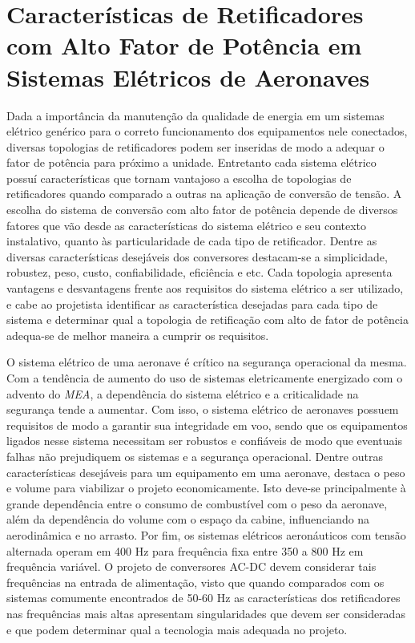 \section{Características de Retificadores com Alto Fator de Potência em Sistemas Elétricos de Aeronaves}

Dada a importância da manutenção da qualidade de energia em um sistemas elétrico genérico para o correto funcionamento dos equipamentos nele conectados, diversas topologias de retificadores podem ser inseridas de modo a adequar o fator de potência para próximo a unidade. Entretanto cada sistema elétrico possuí características que tornam vantajoso a escolha de topologias de retificadores quando comparado a outras na aplicação de conversão de tensão. A escolha do sistema de conversão com alto fator de potência depende de diversos fatores que vão desde as características do sistema elétrico e seu contexto instalativo, quanto às particularidade de cada tipo de retificador. Dentre as diversas características desejáveis dos conversores destacam-se a simplicidade, robustez, peso, custo, confiabilidade, eficiência e etc. Cada topologia apresenta vantagens e desvantagens frente aos requisitos do sistema elétrico a ser utilizado, e cabe ao projetista identificar as característica desejadas para cada tipo de sistema e determinar qual a topologia de retificação com alto de fator de potência adequa-se de melhor maneira a cumprir os requisitos.

O sistema elétrico de uma aeronave é crítico na segurança operacional da mesma. Com a tendência de aumento do uso de sistemas eletricamente energizado com o advento do \textit{MEA}, a dependência do sistema elétrico e a criticalidade na segurança tende a aumentar. Com isso, o sistema elétrico de aeronaves possuem requisitos de modo a garantir sua integridade em voo, sendo que os equipamentos ligados nesse sistema necessitam ser robustos e confiáveis de modo que eventuais falhas não prejudiquem os sistemas e a segurança operacional. Dentre outras características desejáveis para um equipamento em uma aeronave, destaca o peso e volume para viabilizar o projeto economicamente. Isto deve-se principalmente à grande dependência entre o consumo de combustível com o peso da aeronave, além da dependência do volume com o espaço da cabine, influenciando na aerodinâmica e no arrasto. Por fim, os sistemas elétricos aeronáuticos com tensão alternada operam em 400 Hz para frequência fixa entre 350 a 800 Hz em frequência variável. O projeto de conversores AC-DC devem considerar tais frequências na entrada de alimentação, visto que quando comparados com os sistemas comumente encontrados de 50-60 Hz as características dos retificadores nas frequências mais altas apresentam singularidades que devem ser consideradas e que podem determinar qual a tecnologia mais adequada no projeto.

